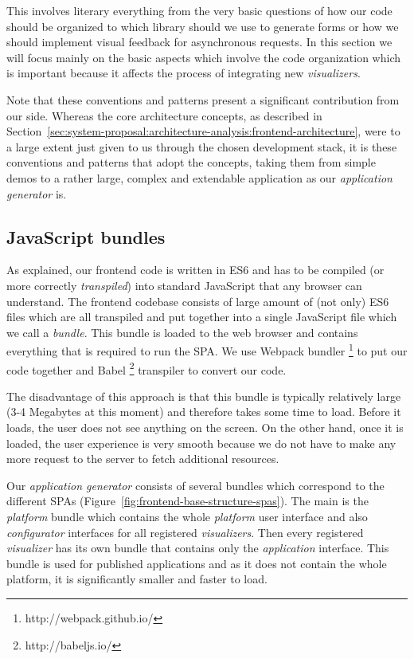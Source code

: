 This involves literary everything from the very basic questions of how our code should be organized to which library should we use to generate forms or how we should implement visual feedback for asynchronous requests. In this section we will focus mainly on the basic aspects which involve the code organization which is important because it affects the process of integrating new \emph{visualizers}.

Note that these conventions and patterns present a significant contribution from our side. Whereas the core architecture concepts, as described in Section~\ref{sec:system-proposal:architecture-analysis:frontend-architecture}, were to a large extent just given to us through the chosen development stack, it is these conventions and patterns that adopt the concepts, taking them from simple demos to a rather large, complex and extendable application as our \emph{application generator} is.

\subsection{JavaScript bundles}

As explained, our frontend code is written in ES6 and has to be compiled (or more correctly \emph{transpiled}) into standard JavaScript that any browser can understand. The frontend codebase consists of large amount of (not only) ES6 files which are all transpiled and put together into a single JavaScript file which we call a \emph{bundle}. This bundle is loaded to the web browser and contains everything that is required to run the SPA. We use Webpack bundler \footnote{http://webpack.github.io/} to put our code together and Babel \footnote{http://babeljs.io/} transpiler to convert our code.

The disadvantage of this approach is that this bundle is typically relatively large (3-4 Megabytes at this moment) and therefore takes some time to load. Before it loads, the user does not see anything on the screen. On the other hand, once it is loaded, the user experience is very smooth because we do not have to make any more request to the server to fetch additional resources.

Our \emph{application generator} consists of several bundles which correspond to the different SPAs (Figure~\ref{fig:frontend-base-structure-spas}). The main is the \emph{platform} bundle which contains the whole \emph{platform} user interface and also \emph{configurator} interfaces for all registered \emph{visualizers}. Then every registered \emph{visualizer} has its own bundle that contains only the \emph{application} interface. This bundle is used for published applications and as it does not contain the whole platform, it is significantly smaller and faster to load.

